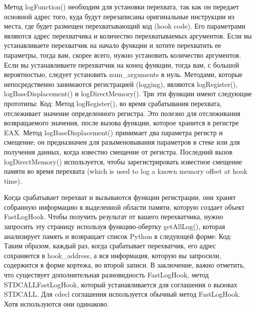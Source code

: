 \documentclass[12pt]{book}
\begin{document}
Метод logFunction() необходим для установки перехвата, так как он передает основной адрес того, куда будут перезаписаны оригинальные инструкции из места, где будет размещен перехватывающий код (hook code). Его параметрами являются адрес перехватчика и количество перехватываемых аргументов. Если вы устанавливаете перехватчик на начало функции и хотите перехватить ее параметры, тогда вам, скорее всего, нужно установить количество аргументов. Если вы устанавливаете перехватчик на конец функции, тогда вам, с большой вероятностью, следует установить num\_arguments в нуль. Методами, которые непосредственно занимаются регистрацией (logging), являются logRegister(), logBaseDisplacement() и logDirectMemory(). Три эти функции имеют следующие прототипы:
Код:
Метод logRegister(), во время срабатывания перехвата, отслеживает значение определенного регистра. Это полезно для отслеживания возвращаемого значения, после вызова функции, которое хранится в регистре EAX. Метод logBaseDisplacement() принимает два параметра регистр и смещение; он предназначен для разыменовывания параметров в стеке или для получения данных, когда известно смещение от регистра. Последний вызов logDirectMemory() используется, чтобы зарегистрировать известное смещение памяти во время перехвата (which is used to log a known memory offset at hook time).

Когда срабатывает перехват и вызываются функции регистрации, они хранят собранную информацию в выделенной области памяти, которую создает объект FastLogHook. Чтобы получить результат от вашего перехватчика, нужно запросить эту страницу используя функцию-обертку getAllLog(), которая анализирует память и возвращает список Python в следующей форме:
Код:
Таким образом, каждый раз, когда срабатывает перехватчик, его адрес сохраняется в hook\_address, а вся информация, которую вы запросили, содержится в форме кортежа, во второй записи. В заключение, важно отметить, что существует дополнительная разновидность FastLogHook, метод STDCALLFastLogHook, который устанавливается для соглашения о вызовах STDCALL. Для cdecl соглашения используется обычный метод FastLogHook. Хотя используются они одинаково.
\end{document}
